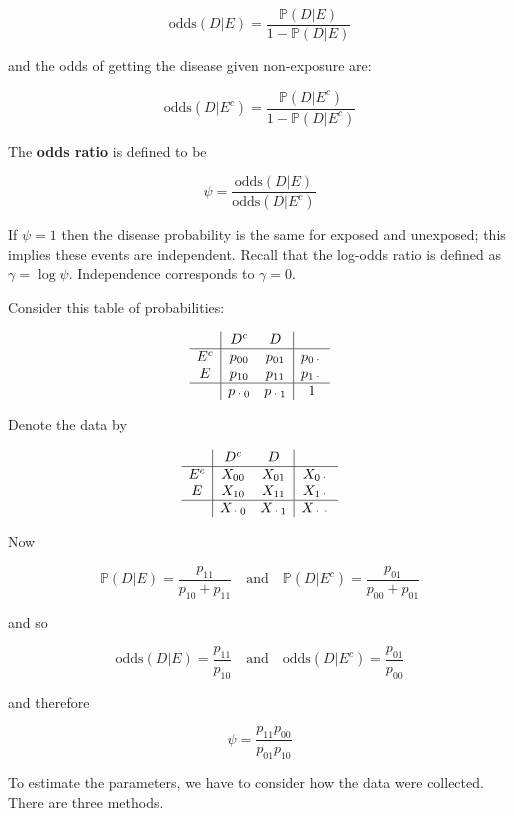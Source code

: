 \[\text{odds}(D | E) = \frac{\mathbb{P}(D | E)}{1 - \mathbb{P}(D | E)}\]

and the odds of getting the disease given non-exposure are:

\[\text{odds}(D | E^c) = \frac{\mathbb{P}(D | E^c)}{1 - \mathbb{P}(D | E^c)}\]

The \textbf{odds ratio} is defined to be

\[\psi = \frac{\text{odds}(D | E)}{\text{odds}(D | E^c)}\]

If \(\psi = 1\) then the disease probability is the same for exposed and
unexposed; this implies these events are independent. Recall that the
log-odds ratio is defined as \(\gamma = \log \psi\). Independence
corresponds to \(\gamma = 0\).

Consider this table of probabilities:

\[
\begin{array}{c|cc|c} 
      & D^c    & D      & \\
\hline
E^c   & p_{00} & p_{01} & p_{0\text{·}}\\
E     & p_{10} & p_{11} & p_{1\text{·}}\\
 \hline
      & p_{\text{·}0} & p_{\text{·}1} & 1
\end{array}
\]

Denote the data by

\[
\begin{array}{c|cc|c} 
      & D^c    & D      & \\
\hline
E^c   & X_{00} & X_{01} & X_{0\text{·}}\\
E     & X_{10} & X_{11} & X_{1\text{·}}\\
 \hline
      & X_{\text{·}0} & X_{\text{·}1} & X_{\text{··}}
\end{array}
\]

Now

\[
\mathbb{P}(D | E) = \frac{p_{11}}{p_{10} + p_{11}}
\quad \text{and} \quad
\mathbb{P}(D | E^c) = \frac{p_{01}}{p_{00} + p_{01}}
\]

and so

\[
\text{odds}(D | E) = \frac{p_{11}}{p_{10}}
\quad \text{and} \quad
\text{odds}(D | E^c) = \frac{p_{01}}{p_{00}}
\]

and therefore

\[ \psi = \frac{p_{11}p_{00}}{p_{01}p_{10}}\]

To estimate the parameters, we have to consider how the data were
collected. There are three methods.

